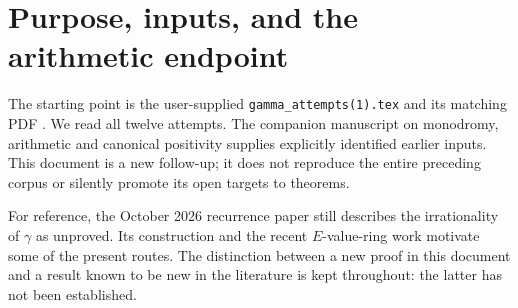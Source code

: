 \documentclass[11pt,a4paper]{article}
\theoremstyle{definition}
\theoremstyle{remark}
\numberwithin{equation}{section}
\begin{document}
\begin{abstract}
We revisit the attached manuscript \emph{Twelve further attempts at the irrationality of Euler's constant, and where each one breaks}, and test six further routes. The main constructive result is completeness of a positive rational-certificate system: with poles confined to the single pair $1\pm i$ and unbounded order, its exactly attainable rational targets are all $r<\gamma$. The remaining primitive integer-error infimum is zero exactly when $\gamma$ is irrational. Thus analytic existence of these certificates is no longer the missing step; their denominator-versus-error control is.

Ramified exponential-integral differences remove logarithmic monodromy while retaining a nonzero multiple of $\gamma$, correcting the scope of an equal-winding obstruction. We describe affine and algebraic loci of regular-singular cancellation and distinguish them from constructions made only under a rationality hypothesis. We also prove an exact decomposition of individual lattice gcds, a signed prime-periodicity law, divergence of fully primitive Hankel polynomials at $\gamma$, and a torsion-character obstruction to transporting Dickman moments to compact $p$-adic distributions. Exact finite certificates and reproducible computations accompany the proofs.

\emph{The irrationality and transcendence of $\gamma$ remain unproved. No previously open conjecture is counted as solved, and no collection of subsidiary statements is presented as ten solutions of published open problems.}
\end{abstract}



\section{Purpose, inputs, and the arithmetic endpoint}
The starting point is the user-supplied \texttt{gamma\_attempts(1).tex}
and its matching PDF \cite{p6:Attached}. We read all twelve attempts.
The companion manuscript on monodromy, arithmetic and canonical
positivity \cite{p6:Companion} supplies explicitly identified earlier
inputs. This document is a new follow-up; it does not reproduce the
entire preceding corpus or silently promote its open targets to theorems.

For reference, the October 2026 recurrence paper \cite{p6:Kalisch2026}
still describes the irrationality of $\gamma$ as unproved. Its
construction and the recent $E$-value-ring work \cite{p6:FR2026} motivate
some of the present routes. The distinction between a new proof in
this document and a result known to be new in the literature is kept
throughout: the latter has not been established.
\end{document}
